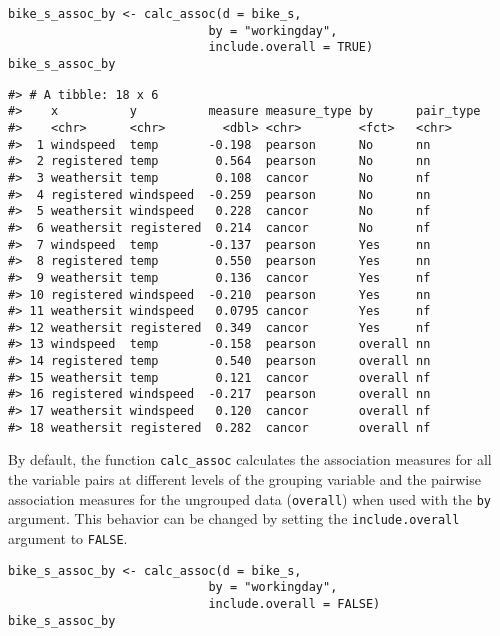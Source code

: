 \begin{verbatim}
bike_s_assoc_by <- calc_assoc(d = bike_s,
                            by = "workingday",
                            include.overall = TRUE)
bike_s_assoc_by
\end{verbatim}

\begin{verbatim}
#> # A tibble: 18 x 6
#>    x          y          measure measure_type by      pair_type
#>    <chr>      <chr>        <dbl> <chr>        <fct>   <chr>    
#>  1 windspeed  temp       -0.198  pearson      No      nn       
#>  2 registered temp        0.564  pearson      No      nn       
#>  3 weathersit temp        0.108  cancor       No      nf       
#>  4 registered windspeed  -0.259  pearson      No      nn       
#>  5 weathersit windspeed   0.228  cancor       No      nf       
#>  6 weathersit registered  0.214  cancor       No      nf       
#>  7 windspeed  temp       -0.137  pearson      Yes     nn       
#>  8 registered temp        0.550  pearson      Yes     nn       
#>  9 weathersit temp        0.136  cancor       Yes     nf       
#> 10 registered windspeed  -0.210  pearson      Yes     nn       
#> 11 weathersit windspeed   0.0795 cancor       Yes     nf       
#> 12 weathersit registered  0.349  cancor       Yes     nf       
#> 13 windspeed  temp       -0.158  pearson      overall nn       
#> 14 registered temp        0.540  pearson      overall nn       
#> 15 weathersit temp        0.121  cancor       overall nf       
#> 16 registered windspeed  -0.217  pearson      overall nn       
#> 17 weathersit windspeed   0.120  cancor       overall nf       
#> 18 weathersit registered  0.282  cancor       overall nf
\end{verbatim}

By default, the function \texttt{calc\_assoc} calculates the association measures for all the variable pairs at different levels of the grouping variable and the pairwise association measures for the ungrouped data (\texttt{overall}) when used with the \texttt{by} argument. This behavior can be changed by setting the \texttt{include.overall} argument to \texttt{FALSE}.

\begin{verbatim}
bike_s_assoc_by <- calc_assoc(d = bike_s,
                            by = "workingday",
                            include.overall = FALSE)
bike_s_assoc_by
\end{verbatim}

